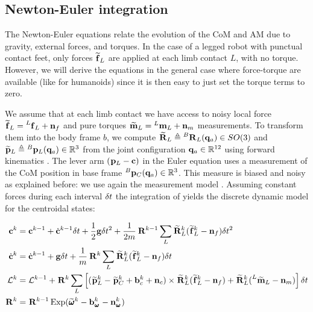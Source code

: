 \subsection{Newton-Euler integration}
The Newton-Euler equations  relate the evolution of the CoM and AM due to gravity, external forces, and torques. 
In the case of a legged robot with punctual contact feet, only forces $\prescript{}{}{\widetilde{{\bf f}}}_{L}$ are applied at each limb contact $L$, with no torque. 
However, we will derive the equations in the general case where force-torque are available (like for humanoids) since it is then easy to just set the 
torque terms to zero.

We assume that at each limb contact we have access to noisy local force $\prescript{}{}{\widetilde{{\bf f}}}_{L} = \prescript{L}{}{{\bf f}}_{L} + {\bf n}_f$ and pure torques 
$\prescript{}{}{\widetilde{\bf m}}_{L} = \prescript{L}{}{\bf m}_{L} + {\bf n}_m$ measurements. 
To transform them into the body frame $b$, we compute $\prescript{}{}{\widetilde{{\bf R}}}_{L} \triangleq \prescript{B}{}{{\bf R}}_{L}({\bf q}_a)  \in SO(3)$ and $\prescript{}{}{\widetilde{{\bf p}}}_{L} \triangleq \prescript{B}{}{{\bf p}}_{L}({\bf q}_a) \in \mathbb{R}^3 $ 
from the joint configuration ${\bf q}_a  \in \mathbb{R}^{12}$ using forward kinematics . 
The lever arm $(\prescript{}{}{{\bf p}}_{L} - {\bf c})$ in the Euler equation  uses a measurement of the CoM position in base frame $ \prescript{B}{}{{\bf p}}_{C}({\bf q}_a) \in \mathbb{R}^3$. 
This measure is biased and noisy as explained before: we use again the measurement model .
Assuming constant forces during each interval $\delta t$ the integration of  yields the discrete dynamic model for the centroidal states:


\begin{equation}
    \begin{split}
        {\bf c}^{k} &= {\bf c}^{k-1} + \dot{{\bf c}}^{k-1} \delta t+\frac{1}{2} {\bf g} \delta t^2 + \frac{1}{2m} \prescript{}{}{{\bf R}}_{}^{k-1} \sum_L \prescript{}{}{\widetilde{{\bf R}}}_{L}^k (\prescript{}{}{\widetilde{{\bf f}}}_{L}^k - {\bf n}_{f}) \delta t^2
        \\
        \dot{{\bf c}}^{k}&= \dot{{\bf c}}^{k-1} + {\bf g} \delta t + \frac{1}{m} \prescript{}{}{{\bf R}}_{}^k \sum_L\prescript{}{}{\widetilde{{\bf R}}}_{L}^k (\prescript{}{}{\widetilde{{\bf f}}}_{L}^k - {\bf n}_{f}) \delta t 
        \\
        \mathcal{L}^{k} &= \mathcal{L}^{k-1} +\prescript{}{}{{\bf R}}_{}^k \sum_L \left[ (\prescript{}{}{\widetilde{{\bf p}}}_{L}^k  - \prescript{}{}{\widetilde{{\bf p}}}_{C}^k +  {\bf b}_{c}^k + {\bf n}_{c}) \times \prescript{}{}{\widetilde{{\bf R}}}_{L}^k(\prescript{}{}{\widetilde{{\bf f}}}_{L}^k - {\bf n}_{f}) 
                                                        + \prescript{}{}{\widetilde{{\bf R}}}_{L}^k(\prescript{L}{}{\widetilde{\bf m}}_{L} - {\bf n}_m)\right]\delta t
        \\
        \prescript{}{}{{\bf R}}_{}^k &= \prescript{}{}{{\bf R}}_{}^{k-1}\operatorname*{Exp}(\prescript{}{}{\widetilde{\pmb{\omega}}}_{}^k - {\bf b}_{\prescript{}{}{\pmb{\omega}}_{}}^k - {\bf n}_{\prescript{}{}{\pmb{\omega}}_{}}^k)
    \end{split}
    \label{eq:COMDiscrete}
\end{equation}

